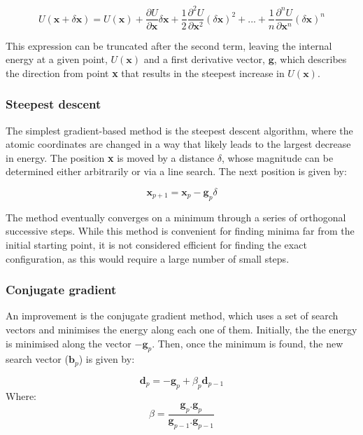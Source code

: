 \documentclass[12pt]{report}
\begin{document}
\begin{equation}
    U(\textbf{x} + \delta\textbf{x}) = U(\textbf{x}) + \frac{\partial U}{\partial \textbf{x}} \delta \textbf{x} + \frac{1}{2} \frac{\partial^2 U}{\partial \textbf{x}^2} (\delta \textbf{x})^2 + ... + \frac{1}{n} \frac{\partial^n U}{\partial \textbf{x}^n} (\delta \textbf{x})^n
\label{taylor}
\end{equation}

\noindent
This expression can be truncated after the second term, leaving the internal energy at a given point, $U(\textbf{x})$ and a first derivative vector, $\textbf{g}$, which describes the direction from point \textbf{x} that results in the steepest increase in $U(\textbf{x})$.

\subsubsection{Steepest descent}

The simplest gradient-based method is the steepest descent algorithm, where the atomic coordinates are changed in a way that likely leads to the largest decrease in energy.
The position \textbf{x} is moved by a distance $\delta$, whose magnitude can be determined either arbitrarily or via a line search.
The next position is given by:

\begin{equation}
    \textbf{x}_{p+1} = \textbf{x}_p - \textbf{g}_p \delta
\end{equation}
 
 \noindent
The method eventually converges on a minimum through a series of orthogonal successive steps. 
While this method is convenient for finding minima far from the initial starting point, it is not considered efficient for finding the exact configuration, as this would require a large number of small steps.

\subsubsection{Conjugate gradient}

An improvement is the conjugate gradient method, which uses a set of search vectors and minimises the energy along each one of them.
Initially, the the energy is minimised along the vector $-\textbf{g}_p$.
Then, once the minimum is found, the new search vector ($\textbf{b}_p$) is given by:

\begin{equation}
    \textbf{d}_p = -\textbf{g}_p + \beta_{p} \textbf{d}_{p-1}
\end{equation}
Where:
\begin{equation}
    \beta = \frac{\textbf{g}_p.\textbf{g}_p}{\textbf{g}_{p-1}.\textbf{g}_{p-1}}
\end{equation}
\end{document}
